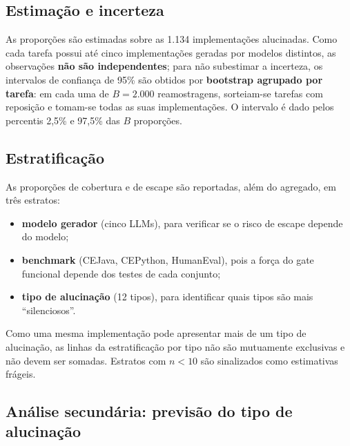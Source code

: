 \subsection{Estimação e incerteza}
\label{sec:estimacao}

As proporções são estimadas sobre as 1.134 implementações alucinadas. Como cada tarefa possui até cinco implementações geradas por modelos distintos, as observações \textbf{não são independentes}; para não subestimar a incerteza, os intervalos de confiança de 95\% são obtidos por \textbf{bootstrap agrupado por tarefa}: em cada uma de $B = 2.000$ reamostragens, sorteiam-se tarefas com reposição e tomam-se todas as suas implementações. O intervalo é dado pelos percentis 2,5\% e 97,5\% das $B$ proporções.

\subsection{Estratificação}
\label{sec:estratificacao}

As proporções de cobertura e de escape são reportadas, além do agregado, em três estratos:
\begin{itemize}
    \item \textbf{modelo gerador} (cinco LLMs), para verificar se o risco de escape depende do modelo;
    \item \textbf{benchmark} (CEJava, CEPython, HumanEval), pois a força do gate funcional depende dos testes de cada conjunto;
    \item \textbf{tipo de alucinação} (12 tipos), para identificar quais tipos são mais ``silenciosos''.
\end{itemize}
Como uma mesma implementação pode apresentar mais de um tipo de alucinação, as linhas da estratificação por tipo não são mutuamente exclusivas e não devem ser somadas. Estratos com $n < 10$ são sinalizados como estimativas frágeis.

\subsection{Análise secundária: previsão do tipo de alucinação}
\label{sec:previsao}

